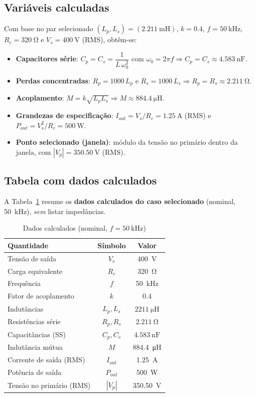 \documentclass[conference]{IEEEtran}
\begin{document}
\subsection{Variáveis calculadas}
Com base no par selecionado $(L_p,L_s)=(\SI{2,211}{\milli\henry})$, $k=\num{0.4}$, $f=\SI{50}{\kilo\hertz}$, $R_c=\SI{320}{\ohm}$ e $V_s=\SI{400}{\volt}$ (RMS), obtêm-se:
\begin{itemize}
  \item \textbf{Capacitores série}: $C_p=C_s=\dfrac{1}{L\,\omega_0^2}$ com $\omega_0=2\pi f \Rightarrow C_p=C_s\approx \SI{4.583}{\nano\farad}$.
  \item \textbf{Perdas concentradas}: $R_p=1000\,L_p$ e $R_s=1000\,L_s \Rightarrow R_p=R_s\approx \SI{2.211}{\ohm}$.
  \item \textbf{Acoplamento}: $M=k\sqrt{L_pL_s}\Rightarrow M\approx \SI{884.4}{\micro\henry}$.
  \item \textbf{Grandezas de especificação}: $I_{out}=V_s/R_c=\SI{1.25}{\ampere}$ (RMS) e $P_{out}=V_s^2/R_c=\SI{500}{\watt}$.
  \item \textbf{Ponto selecionado (janela)}: módulo da tensão no primário dentro da janela, com $|V_p|=\SI{350.50}{\volt}$ (RMS).
\end{itemize}

\subsection{Tabela com dados calculados}
A Tabela~\ref{tab:dados_calc_nominal} resume os \textbf{dados calculados do caso selecionado} (nominal, \SI{50}{\kilo\hertz}), \emph{sem} listar impedâncias.
\begin{table}[H]
  \caption{Dados calculados (nominal, $f=\SI{50}{\kilo\hertz}$)}
  \label{tab:dados_calc_nominal}
  \centering
  \begin{tabular}{lcc}
    \toprule
    Quantidade & Símbolo & Valor \\
    \midrule
    Tensão de saída & $V_s$ & \SI{400}{\volt} \\
    Carga equivalente & $R_c$ & \SI{320}{\ohm} \\
    Frequência & $f$ & \SI{50}{\kilo\hertz} \\
    Fator de acoplamento & $k$ & \num{0.4} \\
    Indutâncias & $L_p, L_s$ & $\SI{2211}{\micro\henry}$ \\
    Resistências série & $R_p, R_s$ & $\SI{2.211}{\ohm}$ \\
    Capacitâncias (SS) & $C_p, C_s$ & $\SI{4.583}{\nano\farad}$ \\
    Indutância mútua & $M$ & \SI{884.4}{\micro\henry} \\
    Corrente de saída (RMS) & $I_{out}$ & \SI{1.25}{\ampere} \\
    Potência de saída & $P_{out}$ & \SI{500}{\watt} \\
    Tensão no primário (RMS) & $|V_p|$ & \SI{350.50}{\volt} \\
    \bottomrule
  \end{tabular}
\end{table}
\end{document}
